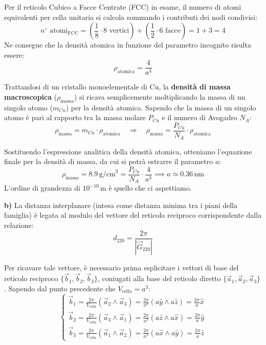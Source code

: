 \begin{exercise}
\begin{solution}
Per il reticolo Cubico a Facce Centrate (FCC) in esame, il numero di atomi equivalenti per cella unitaria si calcola sommando i contributi dei nodi condivisi:
\begin{equation}
    n^\circ \text{ atomi}_{\text{FCC}} = \left( \frac{1}{8} \cdot 8 \text{ vertici} \right) + \left( \frac{1}{2} \cdot 6 \text{ facce} \right) = 1 + 3 = 4
\end{equation}
Ne consegue che la densità atomica in funzione del parametro incognito risulta essere:
\begin{equation}
    \rho_{\text{atomica}} = \frac{4}{a^3}
\end{equation}

Trattandosi di un cristallo monoelementale di Cu, la \textbf{densità di massa macroscopica} (\( \rho_{\text{massa}} \)) si ricava semplicemente moltiplicando la massa di un singolo atomo (\( m_{Cu} \)) per la densità atomica. Sapendo che la massa di un singolo atomo è pari al rapporto tra la massa molare \( P_{Cu} \) e il numero di Avogadro \( N_A \):
\begin{equation}
    \rho_{\text{massa}} = m_{Cu} \cdot \rho_{\text{atomica}} \quad \Rightarrow \quad \rho_{\text{massa}} = \frac{P_{Cu}}{N_A} \cdot \rho_{\text{atomica}}
\end{equation}

Sostituendo l'espressione analitica della densità atomica, otteniamo l'equazione finale per la densità di massa, da cui si potrà estrarre il parametro \( a \):
\begin{equation}
    \rho_{\text{massa}} = 8.9 \, \text{g/cm}^3 = \frac{P_{Cu}}{N_A} \cdot \frac{4}{a^3} \implies a \simeq 0.36 \, \text{nm}
\end{equation}
L'ordine di grandezza di \(10^{-10} \, \text{m}\) è quello che ci aspettiamo.

\textbf{b)} 
La distanza interplanare (intesa come distanza minima tra i piani della famiglia) è legata al modulo del vettore del reticolo reciproco corrispondente dalla relazione:
\begin{equation}
    d_{220} = \frac{2\pi}{|\vec{G}_{220}|}
\end{equation}

Per ricavare tale vettore, è necessario prima esplicitare i vettori di base del reticolo reciproco \(\{\vec{b}_1, \vec{b}_2, \vec{b}_3\}\), coniugati alla base del reticolo diretto \(\{\vec{a}_1, \vec{a}_2, \vec{a}_3\}\). Sapendo dal punto precedente che \(V_{\text{cella}} = a^3\):
\begin{equation}
\begin{cases}
    \vec{b}_1 = \frac{2\pi}{V_{\text{cella}}} (\vec{a}_2 \wedge \vec{a}_3) = \frac{2\pi}{a^3} (a\hat{y} \wedge a\hat{z}) = \frac{2\pi}{a} \hat{x} \\
    \vec{b}_2 = \frac{2\pi}{V_{\text{cella}}} (\vec{a}_3 \wedge \vec{a}_1) = \frac{2\pi}{a^3} (a\hat{z} \wedge a\hat{x}) = \frac{2\pi}{a} \hat{y} \\
    \vec{b}_3 = \frac{2\pi}{V_{\text{cella}}} (\vec{a}_1 \wedge \vec{a}_2) = \frac{2\pi}{a^3} (a\hat{x} \wedge a\hat{y}) = \frac{2\pi}{a} \hat{z}
\end{cases}
\end{equation}


\end{solution}
\end{exercise}
